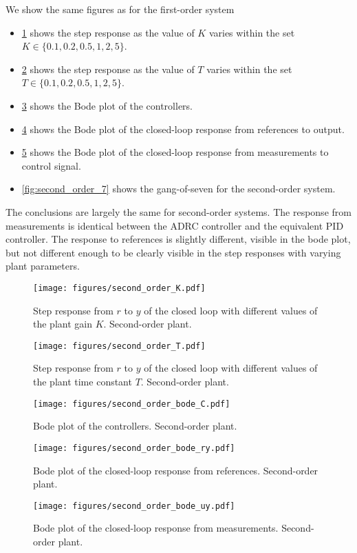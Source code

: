 \documentclass[letterpaper, 10 pt, conference]{ieeeconf}
\begin{document}
We show the same figures as for the first-order system
\begin{itemize}
	\item \cref{fig:second_order_K} shows the step response as the value of $K$ varies within the set $K \in \{0.1, 0.2, 0.5, 1, 2, 5\}$.
	\item \cref{fig:second_order_T} shows the step response as the value of $T$ varies within the set $T \in \{0.1, 0.2, 0.5, 1, 2, 5\}$.
	\item \cref{fig:second_order_bode_C} shows the Bode plot of the controllers.
	\item \cref{fig:second_order_bode_ry} shows the Bode plot of the closed-loop response from references to output.
	\item \cref{fig:second_order_bode_uy} shows the Bode plot of the closed-loop response from measurements to control signal.
	\item \cref{fig:second_order_7} shows the gang-of-seven for the second-order system.
\end{itemize}
The conclusions are largely the same for second-order systems. The response from measurements is identical between the ADRC controller and the equivalent PID controller. The response to references is slightly different, visible in the bode plot, but not different enough to be clearly visible in the step responses with varying plant parameters.

\begin{figure}[h]
	\centering
	\texttt{[image: figures/second\_order\_K.pdf]}
	\caption{Step response from $r$ to $y$ of the closed loop with different values of the plant gain $K$. Second-order plant.}
	\label{fig:second_order_K}
\end{figure}
\begin{figure}[h]
	\centering
	\texttt{[image: figures/second\_order\_T.pdf]}
	\caption{Step response from $r$ to $y$ of the closed loop with different values of the plant time constant $T$. Second-order plant.}
	\label{fig:second_order_T}
\end{figure}
\begin{figure}[h]
	\centering
	\texttt{[image: figures/second\_order\_bode\_C.pdf]}
	\caption{Bode plot of the controllers. Second-order plant.}
	\label{fig:second_order_bode_C}
\end{figure}
\begin{figure}[h]
	\centering
	\texttt{[image: figures/second\_order\_bode\_ry.pdf]}
	\caption{Bode plot of the closed-loop response from references. Second-order plant.}
	\label{fig:second_order_bode_ry}
\end{figure}
\begin{figure}[h]
	\centering
	\texttt{[image: figures/second\_order\_bode\_uy.pdf]}
	\caption{Bode plot of the closed-loop response from measurements. Second-order plant.}
	\label{fig:second_order_bode_uy}
\end{figure}
\end{document}
